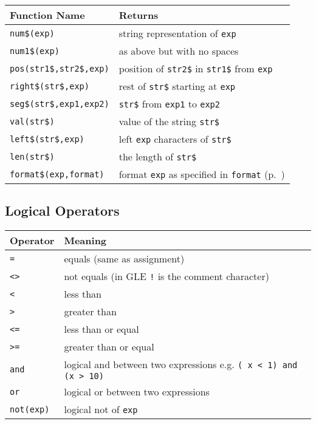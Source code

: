 \begin{supertabular}{ll} \hline
Function Name     & Returns  \\ \hline
{\tt num\$(exp)}      	& string representation of {\tt exp} \\
{\tt num1\$(exp)}    	& as above but with no spaces \\
{\tt pos(str1\$,str2\$,exp)}      & position of {\tt str2\$} in {\tt str1\$} from {\tt exp} \\
{\tt right\$(str\$,exp)}      & rest of {\tt str\$} starting at {\tt exp} \\
{\tt seg\$(str\$,exp1,exp2)}    & {\tt str\$} from {\tt exp1} to {\tt exp2} \\
{\tt val(str\$)}        	& value of the string {\tt str\$} \\
{\tt left\$(str\$,exp)}   & left {\tt exp} characters of {\tt str\$} \\
{\tt len(str\$)}        	& the length of {\tt str\$} \\
{\tt format\$(exp,format)}  & format {\tt exp} as specified in {\tt format} (p.~\pageref{formatnum:pg})\\
\end{supertabular}

\subsection{Logical Operators}


\begin{tabular}{ll} \hline
Operator & Meaning  \\ \hline
{\tt =} \index{=}      & equals (same as assignment) \\
{\tt \textless \textgreater} \index{\textless \textgreater}  & not equals (in GLE {\tt !} is the comment character)  \\
{\tt \textless } \index{\textless} & less than\\
{\tt \textgreater } \index{\textgreater}  & greater than\\
{\tt \textless =} \index{\textless =}  & less than or equal \\
{\tt \textgreater =} \index{\textgreater =}  & greater than or equal \\
{\tt and} \index{and}     & logical and between two expressions e.g. {\tt ( x \textless\ 1) and  (x \textgreater\ 10) }\\
{\tt or} \index{or}     & logical or between two expressions\\
{\tt not(exp)} \index{not()}   & logical not of {\tt exp} \\
\end{tabular}

